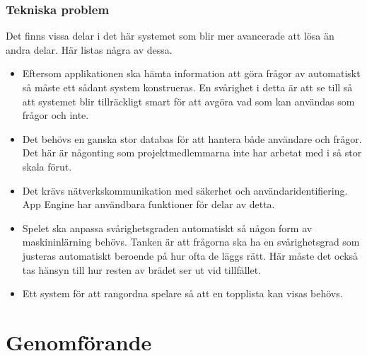 \documentclass[12pt,a4paper]{article}
\begin{document}
\subsubsection{Tekniska problem}
Det finns vissa delar i det här systemet som blir mer avancerade att lösa än andra delar. Här listas några av dessa.
\begin{itemize}
\item Eftersom applikationen ska hämta information att göra frågor av automatiskt så måste ett sådant system konstrueras. En svårighet i detta är att se till så att systemet blir tillräckligt smart för att avgöra vad som kan användas som frågor och inte.
\item Det behövs en ganska stor databas för att hantera både användare och frågor. Det här är någonting som projektmedlemmarna inte har arbetat med i så stor skala förut.
\item Det krävs nätverkskommunikation med säkerhet och användaridentifiering. App Engine har användbara funktioner för delar av detta.
\item Spelet ska anpassa svårighetsgraden automatiskt så någon form av maskininlärning behövs. Tanken är att frågorna ska ha en svårighetsgrad som justeras automatiskt beroende på hur ofta de läggs rätt. Här måste det också tas hänsyn till hur resten av brädet ser ut vid tillfället.
\item Ett system för att rangordna spelare så att en topplista kan visas behövs.
\end{itemize}

\section{Genomförande}
\end{document}
